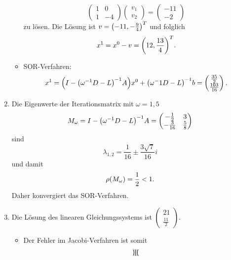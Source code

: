 \documentclass{exercise}
\begin{document}
\begin{enumerate}
\begin{itemize}
            \[
                \begin{pmatrix}
                    1 & 0\\
                    1 & -4
                \end{pmatrix}\begin{pmatrix}
                    v_1\\
                    v_2
                \end{pmatrix} = \begin{pmatrix}
                    -11\\
                    -2
                \end{pmatrix}
            \]
            zu lösen.
            Die Lösung ist \(v = \parentheses*{-11, -\frac{9}{4}}^T\) und folglich
            \[
                x^1 = x^0 - v = \parentheses*{12, \frac{13}{4}}^T.
            \]
            \item SOR-Verfahren:
            \[
                x^1 = \parentheses*{I - \parentheses*{\omega^{-1}D - L}^{-1}A}x^0 + \parentheses*{\omega^-1 D - L}^{-1}b = \begin{pmatrix}
                    \frac{35}{2}\\
                    \frac{103}{16}
                \end{pmatrix}.
            \]
        \end{itemize}
        \item Die Eigenwerte der Iterationsmatrix mit \(\omega = 1,5\)
        \[
            M_\omega = I - \parentheses*{\omega^{-1}D - L}^{-1}A = \begin{pmatrix}
                -\frac{1}{2} & 3\\
                -\frac{3}{16} & \frac{5}{8}
            \end{pmatrix}
        \]
        sind
        \[
            \lambda_{1, 2} = \frac{1}{16} \pm \frac{3\sqrt{7}}{16}i
        \]
        und damit
        \[
            \rho\parentheses*{M_\omega} = \frac{1}{2} < 1.
        \]
        Daher konvergiert das SOR-Verfahren.
        \item Die Lösung des linearen Gleichungssystems ist \(\begin{pmatrix}
            21\\
            \frac{11}{2}
        \end{pmatrix}\).
        \begin{itemize}
            \item Der Fehler im Jacobi-Verfahren ist somit
            \[
                \norm*{\begin{pmatrix}

\end{pmatrix}}\]
\end{itemize}
\end{enumerate}
\end{document}
